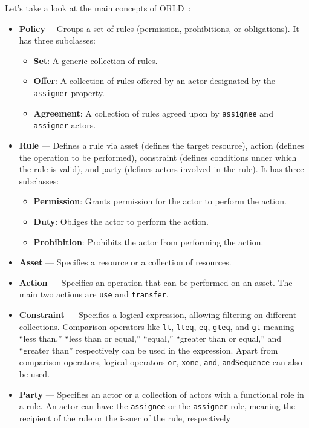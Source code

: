Let's take a look at the main concepts of ORLD~\cite{gaiax_data_exchange_document}:
\begin{itemize}
    \item \textbf{Policy} ---Groups a set of rules (permission, prohibitions, or obligations).
    It has three subclasses:
    \begin{itemize}
        \item \textbf{Set}: A generic collection of rules.
        \item \textbf{Offer}: A collection of rules offered by an actor designated by the \texttt{assigner} property.
        \item \textbf{Agreement}: A collection of rules agreed upon by \texttt{assignee} and \texttt{assigner} actors.
    \end{itemize}
    \item \textbf{Rule} --- Defines a rule via asset (defines the target resource), action (defines the operation to be performed), constraint (defines conditions under which the rule is valid), and party (defines actors involved in the rule).
    It has three subclasses:
    \begin{itemize}
        \item \textbf{Permission}: Grants permission for the actor to perform the action.
        \item \textbf{Duty}: Obliges the actor to perform the action.
        \item \textbf{Prohibition}: Prohibits the actor from performing the action.
    \end{itemize}
    \item \textbf{Asset} --- Specifies a resource or a collection of resources.
    \item \textbf{Action} --- Specifies an operation that can be performed on an asset.
    The main two actions are \texttt{use} and \texttt{transfer}.
    \item \textbf{Constraint} --- Specifies a logical expression, allowing filtering on different collections.
    Comparison operators like \texttt{lt}, \texttt{lteq}, \texttt{eq}, \texttt{gteq}, and \texttt{gt} meaning ``less than,'' ``less than or equal,'' ``equal,'' ``greater than or equal,'' and ``greater than'' respectively can be used in the expression.
    Apart from comparison operators, logical operators \texttt{or}, \texttt{xone}, \texttt{and}, \texttt{andSequence} can also be used.
    \item \textbf{Party} --- Specifies an actor or a collection of actors with a functional role in a rule.
    An actor can have the \texttt{assignee} or the \texttt{assigner} role, meaning the recipient of the rule or the issuer of the rule, respectively
\end{itemize}

